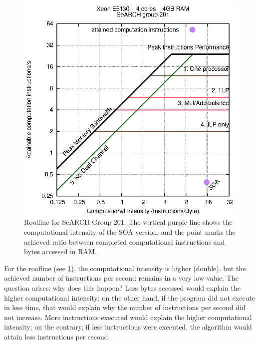 \documentclass[abstract=on,9pt,twocolumn]{scrartcl}
\begin{document}
\begin{figure}[!htp]
	\begin{center}
		\includegraphics[width=\columnwidth]{images/report.april/rooflineSOA.eps}
	\end{center}
	\caption{Roofline for SeARCH Group 201. The vertical purple line shows the computational intensity of the SOA version, and the point marks the achieved ratio between completed computational instructions and bytes accessed in RAM.}
	\label{fig:rooflineSOA}
\end{figure}

For the roofline (see \cref{fig:rooflineSOA}), the computational intensity is higher (double), but the achieved number of instructions per second remains in a very low value. The question arises: why does this happen? Less bytes accessed would explain the higher computational intensity; on the other hand, if the program did not execute in less time, that would explain why the number of instructions per second did not increase. More instructions executed would explain the higher computational intensity; on the contrary, if less instructions were executed, the algorithm would attain less instructions per second.
\end{document}
